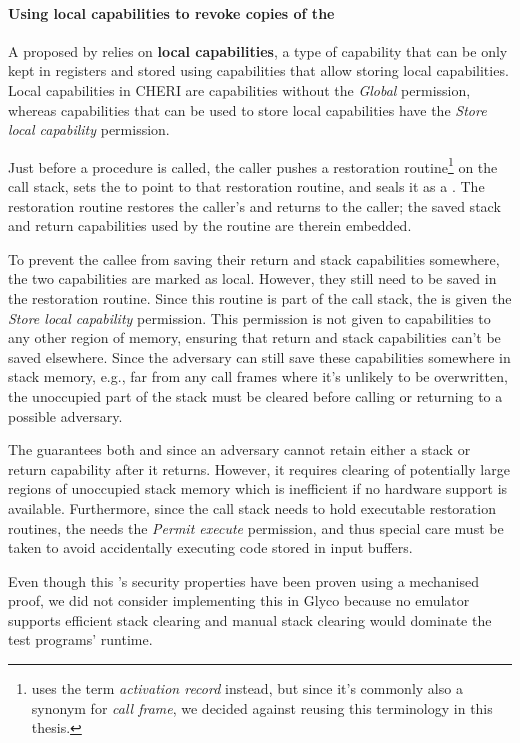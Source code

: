 \documentclass[main.tex]{subfiles}
\begin{document}
\paragraph{Using local capabilities to revoke copies of the } A  proposed by \cite{retptr} relies on \textbf{local capabilities}, a type of capability that can be only kept in registers and stored using capabilities that allow storing local capabilities. Local capabilities in CHERI are capabilities without the \emph{Global} permission, whereas capabilities that can be used to store local capabilities have the \emph{Store local capability} permission.

Just before a procedure is called, the caller pushes a restoration routine\footnote{\cite{retptr} uses the term \emph{activation record} instead, but since it's commonly also a synonym for \emph{call frame}, we decided against reusing this terminology in this thesis.} on the call stack, sets the  to point to that restoration routine, and seals it as a . The restoration routine restores the caller's  and returns to the caller; the saved stack and return capabilities used by the routine are therein embedded.

To prevent the callee from saving their return and stack capabilities somewhere, the two capabilities are marked as local. However, they still need to be saved in the restoration routine. Since this routine is part of the call stack, the  is given the \emph{Store local capability} permission. This permission is not given to capabilities to any other region of memory, ensuring that return and stack capabilities can't be saved elsewhere. Since the adversary can still save these capabilities somewhere in stack memory, e.g., far from any call frames where it's unlikely to be overwritten, the unoccupied part of the stack must be cleared before calling or returning to a possible adversary.

The  guarantees both  and  since an adversary cannot retain either a stack or return capability after it returns. However, it requires clearing of potentially large regions of unoccupied stack memory which is inefficient if no hardware support is available. Furthermore, since the call stack needs to hold executable restoration routines, the  needs the \emph{Permit execute} permission, and thus special care must be taken to avoid accidentally executing code stored in input buffers.

Even though this 's security properties have been proven using a mechanised proof, we did not consider implementing this  in Glyco because no emulator supports efficient stack clearing and manual stack clearing would dominate the test programs' runtime.
\end{document}

